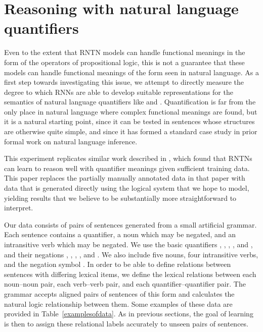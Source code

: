 \section{Reasoning with natural language quantifiers}\label{sec:quantifiers}

Even to the extent that RNTN models can handle functional meanings in
the form of the operators of propositional logic, this is not a
guarantee that these models can handle functional meanings of the form
seen in natural language. As a first step towards investigating this
issue, we attempt to directly measure the degree to which RNNs are
able to develop suitable representations for the semantics of natural language
quantifiers like  and . Quantification is far from
the only place in natural language where complex functional meanings
are found, but it is a natural starting point, since it can be tested
in sentences whose structures are otherwise quite simple, and since it
has formed a standard case study in prior formal work on natural
language inference.


This experiment replicates similar work described in
\cite{bowman2013can}, which found that RNTNs can learn to reason well
with quantifier meanings given sufficient training data. This paper
replaces the partially manually annotated data in that paper with data
that is generated directly using the logical system that we hope to
model, yielding results that we believe to be substantially more
straightforward to interpret.

Our data consists of pairs of sentences generated from a small
artificial grammar. Each sentence contains a quantifier, a noun which
may be negated, and an intransitive verb which may be negated. We use
the basic quantifiers , , , , and
, and their negations ,
, , , and
. We also include five nouns, four intransitive
verbs, and the negation symbol . In order to be able to define
relations between sentences with differing lexical items, we define
the lexical relations between each noun--noun pair, each verb--verb
pair, and each quantifier--quantifier pair. The grammar accepts
aligned pairs of sentences of this form and calculates the natural
logic relationship between them.  Some examples of these data are
provided in Table~\ref{examplesofdata}.  As in previous sections, the
goal of learning is then to assign these relational labels accurately
to unseen pairs of sentences.

